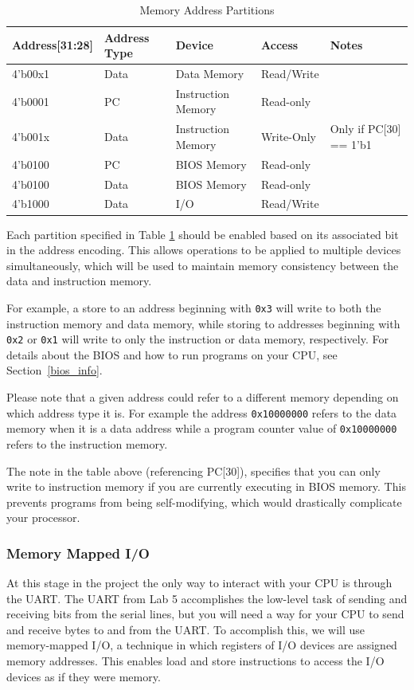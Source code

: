 \documentclass[11pt]{article}
\begin{document}
\begin{table}[hbt]
  \begin{center}
    \caption{Memory Address Partitions}
    \label{mem_space1}
    \begin{tabular}{l l l l l}
      \bottomrule
      \textbf{Address[31:28]} & \textbf{Address Type} & \textbf{Device} & \textbf{Access} & \textbf{Notes} \\
      \midrule
      4'b00x1 & Data & Data Memory & Read/Write &\\
      4'b0001 & PC  &  Instruction Memory & Read-only &\\
      4'b001x & Data & Instruction Memory & Write-Only & Only if PC[30] == 1'b1\\
      4'b0100 & PC  & BIOS Memory & Read-only &\\
      4'b0100 & Data & BIOS Memory & Read-only &\\
      4'b1000 & Data & I/O & Read/Write &\\
      \bottomrule
    \end{tabular}
  \end{center}
\end{table}

Each partition specified in Table \ref{mem_space1} should be enabled based on its associated bit in the address encoding.
This allows operations to be applied to multiple devices simultaneously, which will be used to maintain memory consistency between the data and instruction memory.

For example, a store to an address beginning with \verb|0x3| will write to both the instruction memory and data memory, while storing to addresses beginning with \verb|0x2| or \verb|0x1| will write to only the instruction or data memory, respectively.
For details about the BIOS and how to run programs on your CPU, see Section~\ref{bios_info}.

Please note that a given address could refer to a different memory depending on which address type it is.
For example the address \verb|0x10000000| refers to the data memory when it is a data address while a program counter value of \verb|0x10000000| refers to the instruction memory.

The note in the table above (referencing PC[30]), specifies that you can only write to instruction memory if you are currently executing in BIOS memory.
This prevents programs from being self-modifying, which would drastically complicate your processor.

\subsubsection{Memory Mapped I/O}
\label{mmio}
At this stage in the project the only way to interact with your CPU is through the UART.
The UART from Lab 5 accomplishes the low-level task of sending and receiving bits from the serial lines, but you will need a way for your CPU to send and receive bytes to and from the UART.
To accomplish this, we will use memory-mapped I/O, a technique in which registers of I/O devices are assigned memory addresses.
This enables load and store instructions to access the I/O devices as if they were memory.
\end{document}
